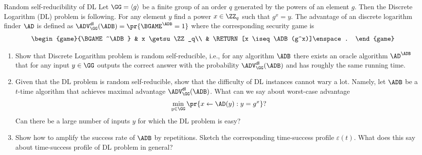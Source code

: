 \documentclass{crypto-exercise}
\author{Sven Laur}
\begin{document}
\newcommand{\XS}{x_{*}}
\newcommand{\XZ}{x_{0}}
\newcommand{\XGUESS}{x_{\text{guess}}}
\newcommand{\YZ}{y_{0}}
\newcommand{\TMAX}{t_{\mathrm{max}}}


\begin{exercise}{Random self-reducibility of DL}
  Let $\GG=\langle g\rangle$ be a finite group of an order $q$
  generated by the powers of an element $g$. Then the Discrete
  Logarithm (DL) problem is following. For any element $y$ find a
  power $x\in\ZZ_q$ such that $g^x=y$. The advantage of an discrete
  logarithm finder $\AD$ is defined as
  $\ADVDL{\GG}{\ADB}=\pr{\BGAME^\ADB=1}$ where the corresponding
  security game is 
  \begin{align*}
    \begin{game}{\BGAME^\ADB}
      & x \getsu \ZZ_q\\
      & \RETURN [x \iseq \ADB(g^x)]\enspace.
    \end{game}
  \end{align*}
  \begin{enumerate}
  \item Show that Discrete Logarithm problem is random self-reducible,
    i.e., for any algorithm $\ADB$ there exists an oracle algorithm
    $\AD^{\ADB}$ that for any input $y\in\GG$ outputs the correct
    answer with the probability $\ADVDL{\GG}{\ADB}$ and has roughly
    the same running time.
  \item Given that the DL problem is random self-reducible, show that
    the difficulty of DL instances cannot wary a lot. Namely, let
    $\ADB$ be a $t$-time algorithm that achieves maximal advantage
    $\ADVDL{\GG}{\ADB}$. What can we say about worst-case advantage
    \begin{align*}
      \min_{y\in\GG}\pr{x\gets\AD(y): y=g^x}?
    \end{align*}
    Can there be a large number of inputs $y$ for which the DL problem
    is easy?
  \item Show how to amplify the success rate of $\ADB$ by
    repetitions. Sketch the corresponding time-success profile
    $\varepsilon(t)$. What does this say about time-success profile of
    DL problem in general?
  \end{enumerate}
\end{exercise}
\end{document}
